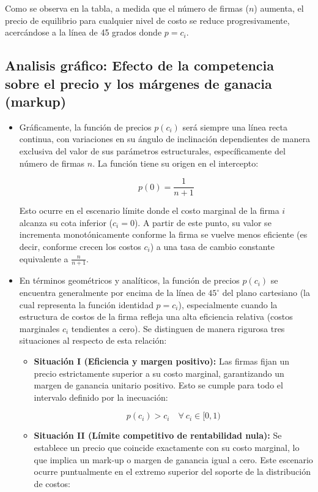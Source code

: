 \documentclass[12pt]{article}
\begin{document}
Como se observa en la tabla, a medida que el número de firmas ($n$) aumenta, el precio de equilibrio para cualquier nivel de costo se reduce progresivamente, acercándose a la línea de 45 grados donde $p = c_i$.

\subsection{Analisis gráfico: Efecto de la competencia sobre el precio y los márgenes de ganacia (markup)}
\begin{itemize}
    \item Gráficamente, la función de precios $p(c_{i})$ será siempre una línea recta continua, con variaciones en su ángulo de inclinación dependientes de manera exclusiva del valor de sus parámetros estructurales, específicamente del número de firmas $n$. La función tiene su origen en el intercepto:
   
    $$ p(0) = \frac{1}{n+1} $$
   
    Esto ocurre en el escenario límite donde el costo marginal de la firma $i$ alcanza su cota inferior ($c_{i}=0$). A partir de este punto, su valor se incrementa monotónicamente conforme la firma se vuelve menos eficiente (es decir, conforme crecen los costos $c_i$) a una tasa de cambio constante equivalente a $\frac{n}{n+1}$.

    \item En términos geométricos y analíticos, la función de precios $p(c_{i})$ se encuentra generalmente por encima de la línea de $45^\circ$ del plano cartesiano (la cual representa la función identidad $p = c_i$), especialmente cuando la estructura de costos de la firma refleja una alta eficiencia relativa (costos marginales $c_i$ tendientes a cero). Se distinguen de manera rigurosa tres situaciones al respecto de esta relación:
   
    \begin{itemize}
        \item \textbf{Situación I (Eficiencia y margen positivo):} Las firmas fijan un precio estrictamente superior a su costo marginal, garantizando un margen de ganancia unitario positivo. Esto se cumple para todo el intervalo definido por la inecuación:
       
        $$ p(c_{i}) > c_{i} \quad \forall \ c_{i} \in [0, 1) $$
       
        \item \textbf{Situación II (Límite competitivo de rentabilidad nula):} Se establece un precio que coincide exactamente con su costo marginal, lo que implica un mark-up o margen de ganancia igual a cero. Este escenario ocurre puntualmente en el extremo superior del soporte de la distribución de costos:
       

\end{itemize}
\end{itemize}
\end{document}
